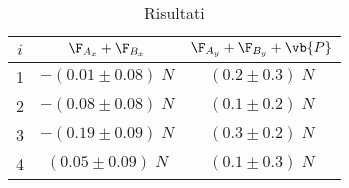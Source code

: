 \begin{table}[h!]
    
    \hspace{5mm} 
    \begin{tabular}{|c|c|c|}
        \hline
        $i$ & $\F_{A_x} + \F_{B_x}$& $\F_{A_y} + \F_{B_y} + \vb{P}$\\
        \hline
        1 & $-(0.01 \pm 0.08)\; N$  & $(0.2\pm 0.3) \;N$\\
        2 & $-(0.08 \pm 0.08)\; N$  & $(0.1\pm 0.2) \;N$\\
        3 & $-(0.19 \pm 0.09)\; N$  & $(0.3\pm 0.2) \;N$\\
        4 & $(0.05 \pm 0.09)\; N$  & $(0.1\pm 0.3) \;N$\\
       


        \hline
    \end{tabular}
    \caption{Risultati}
    \label{tabellaRis}
\end{table}
